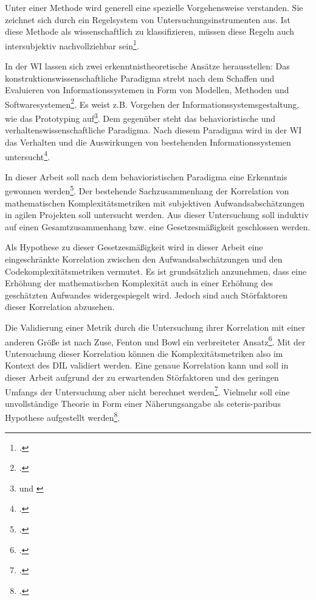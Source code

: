 Unter einer Methode wird generell eine spezielle Vorgehensweise
verstanden. Sie zeichnet sich durch ein Regelsystem von
Untersuchungsinstrumenten aus. Ist diese Methode als wissenschaftlich zu
klassifizieren, müssen diese Regeln auch intersubjektiv nachvollziehbar
sein\footcite[Vgl. ][S. 1f]{wildeMethodenspektrumWirtschaftsinformatikUberblick2006}.

In der \ac{WI} lassen sich zwei erkenntnistheoretische Ansätze herausstellen:
Das konstruktionswissenschaftliche Paradigma strebt nach dem Schaffen
und Evaluieren von Informationssystemen in Form von Modellen, Methoden
und Softwaresystemen\footcite[Vgl. ][S. 2]{wildeMethodenspektrumWirtschaftsinformatikUberblick2006}. Es weist z.B.
Vorgehen der Informationssystemsgestaltung, wie das Prototyping
auf\footnote{\cite[Vgl. ][S. 3]{wildeMethodenspektrumWirtschaftsinformatikUberblick2006} und \cite{simonSciencesArtificial2019}}. Dem gegenüber steht das
behavioristische und verhaltenswissenschaftliche Paradigma. Nach diesem
Paradigma wird in der \ac{WI} das Verhalten und die Auswirkungen von
bestehenden Informationssystemen untersucht\footcite[Vgl. ][S. 3]{wildeMethodenspektrumWirtschaftsinformatikUberblick2006}.

In dieser Arbeit soll nach dem behavioristischen Paradigma eine
Erkenntnis gewonnen werden\footcite[Vgl. ][S. 3]{wildeMethodenspektrumWirtschaftsinformatikUberblick2006}. Der
bestehende Sachzusammenhang der Korrelation von mathematischen
Komplexitätsmetriken mit subjektiven Aufwandsabschätzungen in agilen
Projekten soll untersucht werden. Aus dieser Untersuchung soll induktiv
auf einen Gesamtzusammenhang bzw. eine Gesetzesmäßigkeit geschlossen
werden.

Als Hypothese zu dieser Gesetzesmäßigkeit wird in dieser Arbeit eine
eingeschränkte Korrelation zwischen den Aufwandsabschätzungen und den
Codekomplexitätsmetriken vermutet. Es ist grundsätzlich anzunehmen, dass
eine Erhöhung der mathematischen Komplexität auch in einer Erhöhung des
geschätzten Aufwandes widergespiegelt wird. Jedoch sind auch
Störfaktoren dieser Korrelation abzusehen.

Die Validierung einer Metrik durch die Untersuchung ihrer Korrelation
mit einer anderen Größe ist nach Zuse, Fenton und Bowl ein verbreiteter
Ansatz\footcite[Vgl. ][S. 561f]{zuseSoftwareComplexityMeasures1991}. Mit der Untersuchung dieser
Korrelation können die Komplexitätsmetriken also im Kontext des DIL
validiert werden. Eine genaue Korrelation kann und soll in dieser Arbeit
aufgrund der zu erwartenden Störfaktoren und des geringen Umfangs der
Untersuchung aber nicht berechnet werden\footcite[Vgl. ][S. 449]{jonesAppliedSoftwareMeasurement2008}.
Vielmehr soll eine unvollständige Theorie in Form einer Näherungsangabe
als ceteris-paribus Hypothese aufgestellt werden\footcite[Vgl. ][S. 3]{wildeMethodenspektrumWirtschaftsinformatikUberblick2006}.

